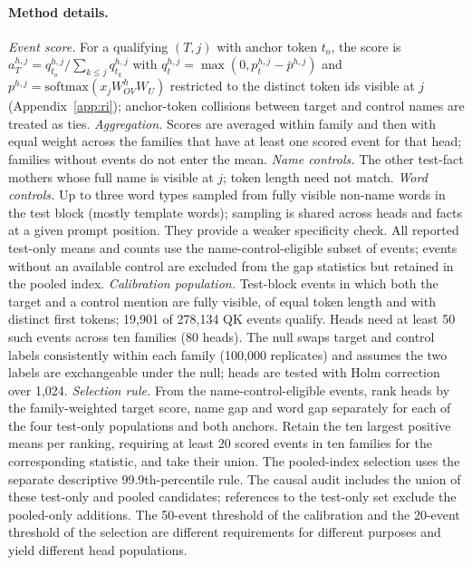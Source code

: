 \paragraph{Method details.}
\emph{Event score.} For a qualifying $(T,j)$ with anchor token $t_o$, the score is
$a^{h,j}_T=q^{h,j}_{t_o}/\sum_{k\le j}q^{h,j}_{t_k}$ with
$q^{h,j}_t=\max(0,p^{h,j}_t-\bar p^{h,j})$ and
$p^{h,j}=\mathrm{softmax}(x_jW^h_{OV}W_U)$ restricted to the distinct token ids
visible at $j$ (Appendix~\ref{app:ri}); anchor-token collisions between target and
control names are treated as ties. \emph{Aggregation.} Scores are averaged within
family and then with equal weight across the families that have at least one
scored event for that head; families without events do not enter the mean.
\emph{Name controls.} The other test-fact mothers whose full name is visible at
$j$; token length need not match. \emph{Word controls.} Up to three word types
sampled from fully visible non-name words in the test block (mostly template words);
sampling is shared across heads and facts at a given prompt position. They provide
a weaker specificity check. All reported test-only means and counts use the
name-control-eligible subset of events; events without an available control are
excluded from the gap statistics but retained in the pooled index.
\emph{Calibration population.} Test-block events in which both the target and a
control mention are fully visible, of equal token length and with distinct first
tokens; 19,901 of 278,134 QK events qualify. Heads need at least 50 such events
across ten families (80 heads). The null swaps target and control labels
consistently within each family (100{,}000 replicates) and assumes the two labels
are exchangeable under the null; heads are tested with Holm correction over 1,024.
\emph{Selection rule.} From the name-control-eligible events, rank heads by the
family-weighted target score, name gap and word gap separately for each of the
four test-only populations and both anchors. Retain the ten largest positive
means per ranking, requiring at least 20 scored events in ten families for the
corresponding statistic, and take their union. The pooled-index selection uses the
separate descriptive 99.9th-percentile rule. The causal audit includes the union
of these test-only and pooled candidates; references to the test-only set exclude
the pooled-only additions. The 50-event threshold of the calibration and
the 20-event threshold of the selection are different requirements for different
purposes and yield different head populations.

